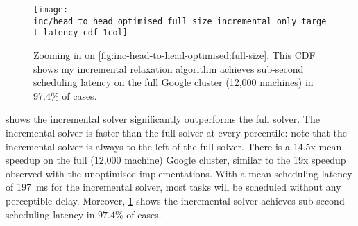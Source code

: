 %

\begin{figure}
    \texttt{[image: inc/head\_to\_head\_optimised\_full\_size\_incremental\_only\_target\_latency\_cdf\_1col]}
    \caption[Performance of my incremental algorithm on the full Google cluster]{Zooming in on \cref{fig:inc-head-to-head-optimised:full-size}. This CDF shows my incremental relaxation algorithm achieves sub-second scheduling latency on the full Google cluster (12,000 machines) in 97.4\% of cases.}
    \label{fig:inc-head-to-head-optimised-inconly}
\end{figure}

 shows the incremental solver significantly outperforms the full solver. The incremental solver is faster than the full solver at every percentile: note that the incremental solver is always to the left of the full solver. There is a 14.5x mean speedup on the full (12,000 machine) Google cluster, similar to the 19x speedup observed with the unoptimised implementations\footnotemark. With a mean scheduling latency of \SI{197}{\milli\second} for the incremental solver, most tasks will be scheduled without any perceptible delay. Moreover, \cref{fig:inc-head-to-head-optimised-inconly} shows the incremental solver achieves sub-second scheduling latency in $97.4\%$ of cases.

